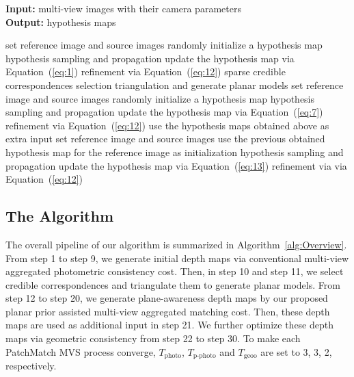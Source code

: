 \documentclass[letterpaper]{article} %
\begin{document}
\begin{algorithm}[t]
	\caption{Planar Prior Assisted PatchMatch MVS}
	\label{alg:Overview}
	{\bf Input:} multi-view images with their camera parameters \\
	{\bf Output:} hypothesis maps
	\begin{algorithmic}[1]
		\STATE set reference image and source images
		\STATE randomly initialize a hypothesis map
		\STATE hypothesis sampling and propagation
		\STATE update the hypothesis map via Equation~(\ref{eq:1})
		\STATE refinement via Equation~(\ref{eq:12})
		\ENDFOR
		\ENDFOR
		\STATE sparse credible correspondences selection
		\STATE triangulation and generate planar models
		\STATE set reference image and source images
		\STATE randomly initialize a hypothesis map
		\STATE hypothesis sampling and propagation
		\STATE update the hypothesis map via Equation~(\ref{eq:7})
		\STATE refinement via Equation~(\ref{eq:12})
		\ENDFOR
		\ENDFOR
		\STATE use the hypothesis maps obtained above as extra input
		\STATE set reference image and source images
		\STATE use the previous obtained hypothesis map for the reference image as initialization
		\STATE hypothesis sampling and propagation
		\STATE update the hypothesis map via Equation~(\ref{eq:13})
		\STATE refinement via via Equation~(\ref{eq:12})
		\ENDFOR
		\ENDFOR
	\end{algorithmic}
\end{algorithm}

\subsection{The Algorithm}

The overall pipeline of our algorithm is summarized in Algorithm~\ref{alg:Overview}. From step 1 to step 9, we generate initial depth maps via conventional multi-view aggregated photometric consistency cost. Then, in step 10 and step 11, we select credible correspondences and triangulate them to generate planar models. From step 12 to step 20, we generate plane-awareness depth maps by our proposed planar prior assisted multi-view aggregated matching cost. Then, these depth maps are used as additional input in step 21. We further optimize these depth maps via geometric consistency from step 22 to step 30. To make each PatchMatch MVS process converge, $T_\text{photo}$, $T_\text{p-photo}$ and $T_\text{geoo}$ are set to 3, 3, 2, respectively.
\end{document}
